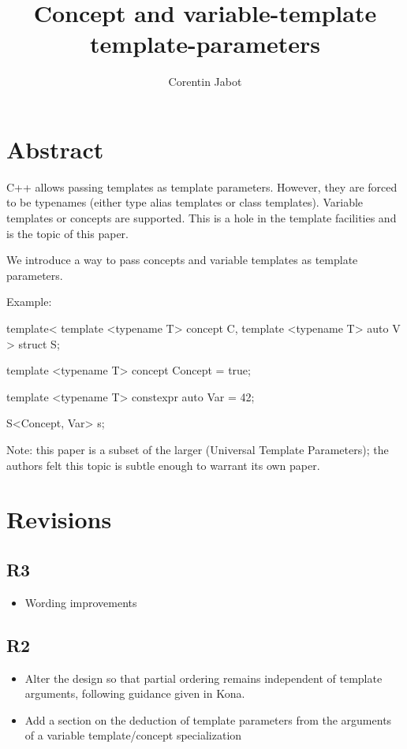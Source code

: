 \documentclass{wg21}
\title{Concept and variable-template template-parameters}
\author{Corentin Jabot}{corentin.jabot@gmail.com}
\begin{document}
\maketitle

\section{Abstract}

C++ allows passing templates as template parameters.
However, they are forced to be typenames (either type alias templates or class templates).
Variable templates or concepts are  supported.
This is a hole in the template facilities and is the topic of this paper.

We introduce a way to pass concepts and variable templates as template parameters.

Example:

\begin{colorblock}
template<
   template <typename T> concept C,
   template <typename T> auto V
>
struct S{};

template <typename T>
concept Concept = true;

template <typename T>
constexpr auto Var = 42;

S<Concept, Var> s;
\end{colorblock}

Note: this paper is a subset of the larger  (Universal Template Parameters); the authors felt this topic is subtle enough to warrant its own paper.

\section{Revisions}


\subsection{R3}

\begin{itemize}
\item Wording improvements
\end{itemize}

\subsection{R2}

\begin{itemize}
\item Alter the design so that partial ordering remains independent of template arguments, following guidance given in Kona.
\item Add a section on the deduction of template parameters from the arguments of a variable template/concept specialization
\end{itemize}
\end{document}
